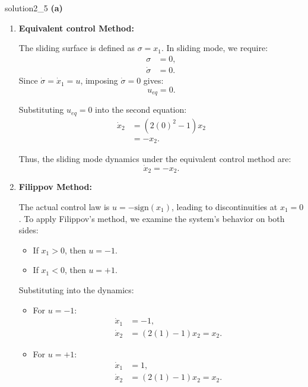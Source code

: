 \begin{solution}{}{solution2_5}
	\textbf{(a)}
	\begin{enumerate}
		\item \textbf{Equivalent control Method:}

		      The sliding surface is defined as $\sigma = x_1$. In sliding mode, we require:
		      \begin{align*}
			      \sigma       & = 0, \\
			      \dot{\sigma} & = 0.
		      \end{align*}
		      Since $\dot{\sigma} = \dot{x}_1 = u$, imposing $\dot{\sigma} = 0$ gives:
		      \[
			      u_{eq} = 0.
		      \]

		      Substituting $u_{eq} = 0$ into the second equation:
		      \begin{align*}
			      \dot{x}_2 & = (2(0)^2 - 1)x_2 \\
			                & = -x_2.
		      \end{align*}

		      Thus, the sliding mode dynamics under the equivalent control method are:
		      \[
			      \dot{x}_2 = -x_2.
		      \]
		\item \textbf{Filippov Method:}

		      The actual control law is $u = -\text{sign}(x_1)$, leading to discontinuities at $x_1 = 0$. To apply Filippov's method, we examine the system's behavior on both sides:

		      \begin{itemize}
			      \item If $x_1 > 0$, then $u = -1$.
			      \item If $x_1 < 0$, then $u = +1$.
		      \end{itemize}

		      Substituting into the dynamics:
		      \begin{itemize}
			      \item For $u = -1$:
			            \begin{align*}
				            \dot{x}_1 & = -1,                  \\
				            \dot{x}_2 & = (2(1) - 1)x_2 = x_2.
			            \end{align*}

			      \item For $u = +1$:
			            \begin{align*}
				            \dot{x}_1 & = 1,                   \\
				            \dot{x}_2 & = (2(1) - 1)x_2 = x_2.
			            \end{align*}
		      \end{itemize}


\end{enumerate}
\end{solution}
